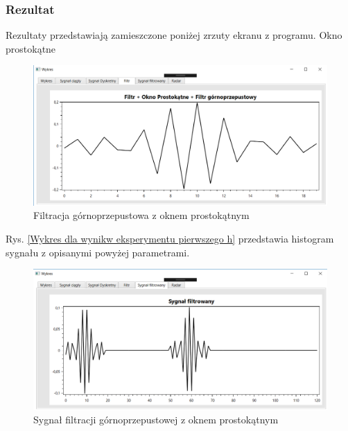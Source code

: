 \documentclass[12pt]{article}
\begin{document}
\subsubsection{Rezultat}

Rezultaty przedstawiają zamieszczone poniżej zrzuty ekranu z programu. 
\newpage
Okno prostokątne
\begin{figure}[h!]
 \centering
 \includegraphics[width=12.3cm]{prostFGOP.PNG}
 \vspace{-0.3cm}
 \caption{Filtracja górnoprzepustowa z oknem prostokątnym}
 \label{Wykres dla wyników eksperymentu drugiego}
\end{figure}
\newpage
Rys. \ref{Wykres dla wynikw eksperymentu pierwszego h} przedstawia histogram sygnału z opisanymi powyżej parametrami. 
\begin{figure}[h!]
 \centering
 \includegraphics[width=12.3cm]{prostSFGP.PNG}
 \vspace{-0.3cm}
 \caption{Sygnał filtracji górnoprzepustowej z oknem prostokątnym}
 \label{Histogram dla wyników eksperymentu drugiego}
\end{figure}
\end{document}
